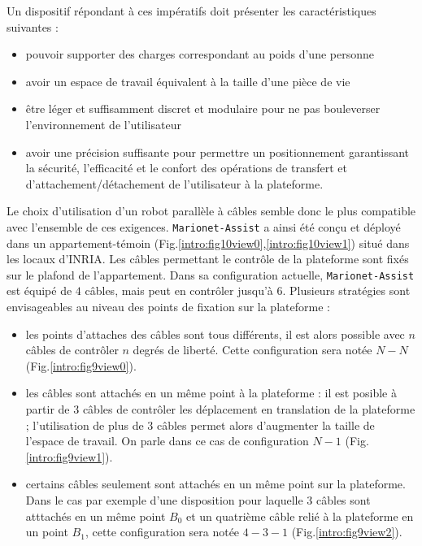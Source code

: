 Un dispositif répondant à ces impératifs doit présenter les caractéristiques suivantes :
\begin{itemize}
 \item pouvoir supporter des charges correspondant au poids d'une personne
 \item avoir un espace de travail équivalent à la taille d'une pièce de vie
 \item être léger et suffisamment discret et modulaire pour ne pas bouleverser l'environnement de l'utilisateur
 \item avoir une précision suffisante pour permettre un positionnement garantissant la sécurité, l'efficacité et le confort des opérations de transfert et d'attachement/détachement de l'utilisateur à la plateforme.
\end{itemize}

Le choix d'utilisation d'un robot parallèle à câbles semble donc le plus compatible avec l'ensemble de ces exigences. {\tt Marionet-Assist} a ainsi été conçu et déployé dans un appartement-témoin (Fig.\ref{intro:fig10view0},\ref{intro:fig10view1}) situé dans les locaux d'INRIA. Les câbles permettant le contrôle de la plateforme sont fixés sur le plafond de l'appartement. Dans sa configuration actuelle, {\tt Marionet-Assist} est équipé de $4$ câbles, mais peut en contrôler jusqu'à $6$. Plusieurs stratégies sont envisageables au niveau des points de fixation sur la plateforme :
\begin{itemize}
 \item les points d'attaches des câbles sont tous différents, il est alors possible avec $n$ câbles de contrôler $n$ degrés de liberté. Cette configuration sera notée $N-N$ (Fig.\ref{intro:fig9view0}).
 \item les câbles sont attachés en un même point à la plateforme : il est posible à partir de $3$ câbles de contrôler les déplacement en translation de la plateforme ; l'utilisation de plus de $3$ câbles permet alors d'augmenter la taille de l'espace de travail. On parle dans ce cas de configuration $N-1$ (Fig.\ref{intro:fig9view1}).
 \item certains câbles seulement sont attachés en un même point sur la plateforme. Dans le cas par exemple d'une disposition pour laquelle $3$ câbles sont atttachés en un même point $B_0$ et un quatrième câble relié à la plateforme en un point $B_1$, cette configuration sera notée $4-3-1$ (Fig.\ref{intro:fig9view2}).
\end{itemize}

